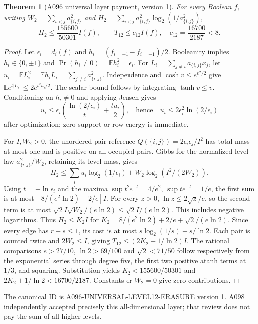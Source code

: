 \documentclass[11pt]{article}
\newtheorem{theorem}[lemma]{Theorem}
\newcommand{\E}{\mathbb E}
\begin{document}
\begin{theorem}[A096 universal layer payment, version 1]
\label{thm:level12}
For every Boolean $f$, writing
$W_2=\sum_{i<j}a_{\{i,j\}}^2$ and
$H_2=\sum_{i<j}a_{\{i,j\}}^2\log_2(1/a_{\{i,j\}}^2)$,
\[
H_2\le\frac{155600}{50301}I(f),\qquad
T_{12}\le c_{12}I(f),\quad c_{12}=\frac{16700}{2187}<8.
\]
\end{theorem}
\begin{proof}
Let $\epsilon_i=d_i(f)$ and
$h_i=(f_{i=+1}-f_{i=-1})/2$. Booleanity implies
$h_i\in\{0,\pm1\}$ and $\Pr(h_i\ne0)=\E h_i^2=\epsilon_i$.
For $L_i=\sum_{j\ne i}a_{\{i,j\}}x_j$, let
$u_i=\E L_i^2=\E h_iL_i=\sum_{j\ne i}a_{\{i,j\}}^2$.
Independence and $\cosh v\le e^{v^2/2}$ give
$\E e^{t|L_i|}\le2e^{t^2u_i/2}$.
The scalar bound follows by integrating $\tanh v\le v$.
Conditioning on $h_i\ne0$ and applying Jensen gives
\[
u_i\le\epsilon_i\left(\frac{\ln(2/\epsilon_i)}t+\frac{tu_i}2\right),
\quad\text{hence}\quad
u_i\le2\epsilon_i^2\ln(2/\epsilon_i)
\]
after optimization; zero support or row energy is immediate.

For $I,W_2>0$, the unordered-pair reference
$Q(\{i,j\})=2\epsilon_i\epsilon_j/I^2$ has total mass at most
one and is positive on all occupied pairs. Gibbs for the normalized
level law $a_{\{i,j\}}^2/W_2$, retaining its level mass, gives
\[
H_2\le\sum_i u_i\log_2(1/\epsilon_i)
                 +W_2\log_2(I^2/(2W_2)).
\]
Using $t=-\ln\epsilon_i$ and the maxima
$\sup t^2e^{-t}=4/e^2$, $\sup te^{-t}=1/e$, the first sum is
at most $[8/(e^2\ln2)+2/e]I$.
For every $z>0$, $\ln z\le2\sqrt z/e$, so the second term
is at most $\sqrt2 I\sqrt{W_2}/(e\ln2)\le\sqrt2 I/(e\ln2)$.
This includes negative logarithms. Thus $H_2\le K_2I$ for
$K_2=8/(e^2\ln2)+2/e+\sqrt2/(e\ln2)$.
Since every edge has $r+s\le1$, its cost is at most
$s\log_2(1/s)+s/\ln2$. Each pair is counted twice and
$2W_2\le I$, giving $T_{12}\le(2K_2+1/\ln2)I$.
The rational comparisons $e>27/10$, $\ln2>69/100$ and
$\sqrt2<71/50$ follow respectively from the exponential series
through degree five, the first two positive atanh terms at $1/3$,
and squaring. Substitution yields
$K_2<155600/50301$ and $2K_2+1/\ln2<16700/2187$.
Constants or $W_2=0$ give zero contributions.
\end{proof}
The canonical ID is A096-UNIVERSAL-LEVEL12-ERASURE version 1.
A098 independently accepted precisely this all-dimensional layer;
that review does not pay the sum of all higher levels.
\end{document}
